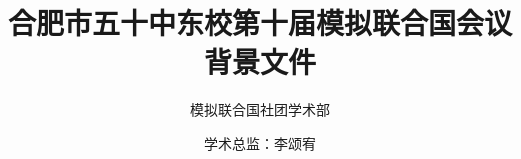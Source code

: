 \documentclass{article}
\title{合肥市五十中东校第十届模拟联合国会议\\\huge 背景文件}
\author{模拟联合国社团学术部 \and 学术总监：李颂宥}
\begin{document}
    \centering
    \maketitle
    \clearpage
    \tableofcontents
\end{document}
